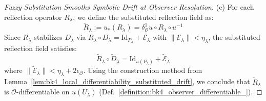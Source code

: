 \begin{proof}[Fuzzy Substitution Smooths Symbolic Drift at Observer Resolution]
(c) For each reflection operator $R_\lambda$, we define the substituted reflection field as:
\[
\tilde{R}_\lambda := u_*(R_\lambda) = \delta^1_\mathcal{O}u \circ R_\lambda \circ u^{-1}
\]
Since $R_\lambda$ stabilizes $D_\lambda$ via $R_\lambda \circ D_\lambda = \text{Id}_{P_\lambda} + \mathcal{E}_\lambda$ with $\|\mathcal{E}_\lambda\| < \eta_\lambda$, the substituted reflection field satisfies:
\[
\tilde{R}_\lambda \circ \tilde{D}_\lambda = \text{Id}_{u(P_\lambda)} + \tilde{\mathcal{E}}_\lambda
\]
where $\|\tilde{\mathcal{E}}_\lambda\| < \eta_\lambda + 2\epsilon_\mathcal{O}$. Using the construction method from Lemma~\ref{lem:bk4_local_differentiability_substituted_drift}, we conclude that $\tilde{R}_\lambda$ is $\mathcal{O}$-differentiable on $u(U_\lambda)$ (Def.~\ref{definition:bk4_observer_differentiable_}).

\end{proof}

